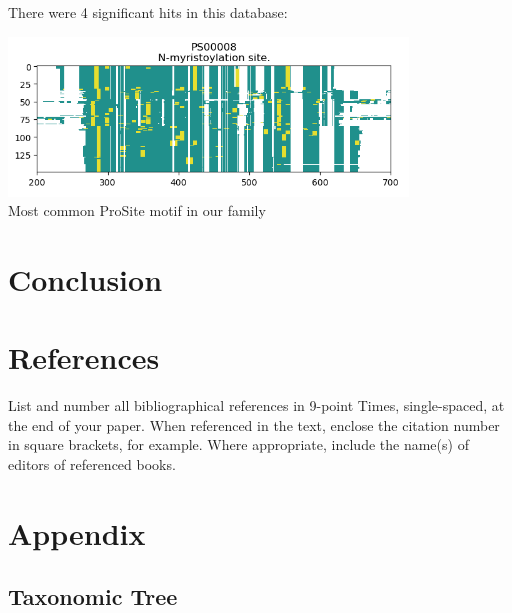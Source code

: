 \documentclass[10pt,twocolumn,letterpaper]{article}
\begin{document}
There were 4 significant hits in this database:

\begin{center}
    \includegraphics[scale=1]{report/img/prosite.png} \\
    \small{Most common ProSite motif in our family}
\end{center}

\section{Conclusion}




\section{References}

List and number all bibliographical references in 9-point Times,
single-spaced, at the end of your paper. When referenced in the text,
enclose the citation number in square brackets, for
example.  Where appropriate, include the name(s) of
editors of referenced books.

%
%

\clearpage %
\onecolumn %

\section{Appendix}


\subsection{Taxonomic Tree}
\label{sec:taxtree}
\end{document}
